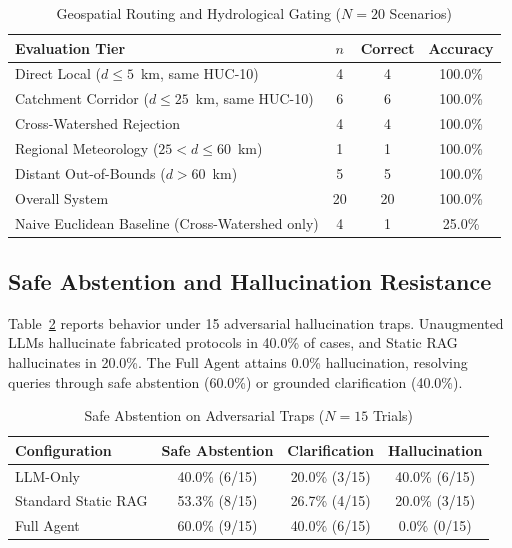 \documentclass[conference]{IEEEtran}
\begin{document}
\begin{table}[h]
\caption{Geospatial Routing and Hydrological Gating ($N=20$ Scenarios)}
\label{tab:geo}
\centering
\scriptsize
\setlength{\tabcolsep}{2.5pt}
\begin{tabular*}{\columnwidth}{@{\extracolsep{\fill}}lccc@{}}
\toprule
Evaluation Tier & $n$ & Correct & Accuracy \\
\midrule
Direct Local ($d \le 5$~km, same HUC-10) & 4 & 4 & 100.0\% \\
Catchment Corridor ($d \le 25$~km, same HUC-10) & 6 & 6 & 100.0\% \\
Cross-Watershed Rejection & 4 & 4 & 100.0\% \\
Regional Meteorology ($25 < d \le 60$~km) & 1 & 1 & 100.0\% \\
Distant Out-of-Bounds ($d > 60$~km) & 5 & 5 & 100.0\% \\
\midrule
Overall System & 20 & 20 & 100.0\% \\
Naive Euclidean Baseline (Cross-Watershed only) & 4 & 1 & 25.0\% \\
\bottomrule
\end{tabular*}
\end{table}

\subsection{Safe Abstention and Hallucination Resistance}
Table~\ref{tab:abstention} reports behavior under 15 adversarial hallucination traps. Unaugmented LLMs hallucinate fabricated protocols in 40.0\% of cases, and Static RAG hallucinates in 20.0\%. The Full Agent attains 0.0\% hallucination, resolving queries through safe abstention (60.0\%) or grounded clarification (40.0\%).

\begin{table}[h]
\caption{Safe Abstention on Adversarial Traps ($N=15$ Trials)}
\label{tab:abstention}
\centering
\footnotesize
\setlength{\tabcolsep}{3pt}
\begin{tabular*}{\columnwidth}{@{\extracolsep{\fill}}lccc@{}}
\toprule
Configuration & Safe Abstention & Clarification & Hallucination \\
\midrule
LLM-Only & 40.0\% (6/15) & 20.0\% (3/15) & 40.0\% (6/15) \\
Standard Static RAG & 53.3\% (8/15) & 26.7\% (4/15) & 20.0\% (3/15) \\
Full Agent & 60.0\% (9/15) & 40.0\% (6/15) & 0.0\% (0/15) \\
\bottomrule
\end{tabular*}
\end{table}
\end{document}
